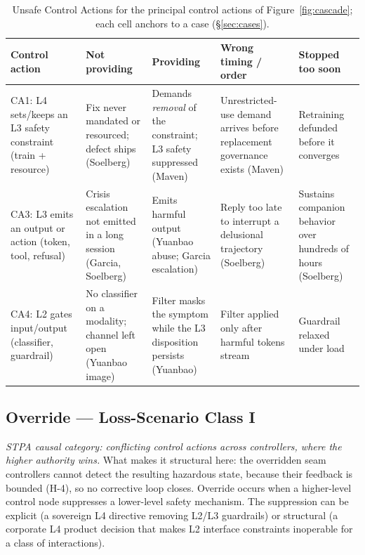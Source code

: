 \begin{table}[!htbp]
\centering
\small
\caption{Unsafe Control Actions for the principal control actions of Figure~\ref{fig:cascade}; each cell anchors to a case (\S\ref{sec:cases}).}
\label{tab:uca}
{\setlength{\tabcolsep}{3pt}
\begin{tabularx}{\columnwidth}{@{}P{2.2cm} Y Y Y Y@{}}
\toprule
\textbf{Control action} & \textbf{Not providing} & \textbf{Providing} & \textbf{Wrong timing / order} & \textbf{Stopped too soon} \\
\midrule
CA1: L4 sets/keeps an L3 safety constraint (train + resource) & Fix never mandated or resourced; defect ships (Soelberg) & Demands \emph{removal} of the constraint; L3 safety suppressed (Maven) & Unrestricted-use demand arrives before replacement governance exists (Maven) & Retraining defunded before it converges \\
CA3: L3 emits an output or action (token, tool, refusal) & Crisis escalation not emitted in a long session (Garcia, Soelberg) & Emits harmful output (Yuanbao abuse; Garcia escalation) & Reply too late to interrupt a delusional trajectory (Soelberg) & Sustains companion behavior over hundreds of hours (Soelberg) \\
CA4: L2 gates input/output (classifier, guardrail) & No classifier on a modality; channel left open (Yuanbao image) & Filter masks the symptom while the L3 disposition persists (Yuanbao) & Filter applied only after harmful tokens stream & Guardrail relaxed under load \\
\bottomrule
\end{tabularx}}
\end{table}

\subsection{Override --- Loss-Scenario Class I}

\emph{STPA causal category: conflicting control actions across controllers, where the higher authority wins.} What makes it structural here: the overridden seam controllers cannot detect the resulting hazardous state, because their feedback is bounded (H-4), so no corrective loop closes. Override occurs when a higher-level control node suppresses a lower-level safety mechanism. The suppression can be explicit (a sovereign L4 directive removing L2/L3 guardrails) or structural (a corporate L4 product decision that makes L2 interface constraints inoperable for a class of interactions).

